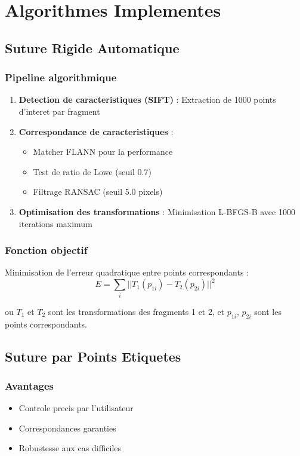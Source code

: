 \documentclass[12pt,a4paper]{article}
\begin{document}
\section{Algorithmes Implementes}

\subsection{Suture Rigide Automatique}

\subsubsection{Pipeline algorithmique}

\begin{enumerate}
\item \textbf{Detection de caracteristiques (SIFT)} : 
   Extraction de 1000 points d'interet par fragment
\item \textbf{Correspondance de caracteristiques} :
   \begin{itemize}
   \item Matcher FLANN pour la performance
   \item Test de ratio de Lowe (seuil 0.7)
   \item Filtrage RANSAC (seuil 5.0 pixels)
   \end{itemize}
\item \textbf{Optimisation des transformations} :
   Minimisation L-BFGS-B avec 1000 iterations maximum
\end{enumerate}

\subsubsection{Fonction objectif}
Minimisation de l'erreur quadratique entre points correspondants :
\begin{equation}
E = \sum_{i} ||T_1(p_{1i}) - T_2(p_{2i})||^2
\end{equation}

ou $T_1$ et $T_2$ sont les transformations des fragments 1 et 2, et $p_{1i}$, $p_{2i}$ sont les points correspondants.

\subsection{Suture par Points Etiquetes}

\subsubsection{Avantages}
\begin{itemize}
\item Controle precis par l'utilisateur
\item Correspondances garanties
\item Robustesse aux cas difficiles
\end{itemize}
\end{document}
